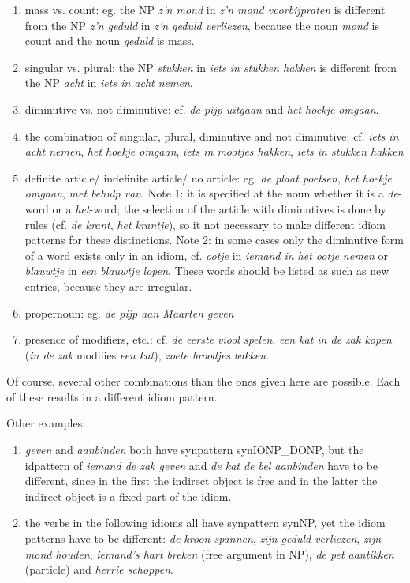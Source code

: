 \begin{enumerate}
  \item mass vs. count: eg. the NP {\em z'n mond} in {\em z'n mond
voorbijpraten} is different from the NP {\em z'n geduld} in {\em z'n geduld
verliezen}, because the noun {\em mond} is count and the noun {\em geduld} is
mass. 
  \item singular vs. plural: the NP {\em stukken} in {\em iets in stukken 
hakken} is different from the NP {\em acht} in  {\em iets in acht nemen}.
  \item diminutive vs. not diminutive: cf. {\em de pijp uitgaan} and {\em het 
hoekje omgaan}.
  \item the combination of singular, plural, diminutive and not diminutive: cf.
{\em iets in acht nemen}, {\em het hoekje omgaan}, {\em iets in mootjes
hakken}, {\em iets in stukken hakken} 
  \item definite article/ indefinite article/ no article: eg. {\em de plaat
poetsen}, {\em het hoekje omgaan}, {\em met behulp van}. Note 1: it is specified
at the noun whether it is a {\em de}-word or a {\em het}-word; the selection of
the article with diminutives is done by rules (cf. {\em de krant}, {\em het
krantje}), so it not necessary to make different idiom patterns for these
distinctions. Note 2: in some cases only the diminutive form of a word exists 
only in an idiom, cf. {\em ootje} in {\em iemand in het ootje nemen} or
{\em blauwtje} in {\em een blauwtje lopen}. These words should be listed as 
such as new entries, because they are irregular.
  \item propernoun: eg. {\em de pijp aan Maarten geven}
  \item presence of modifiers, etc.: cf. {\em de eerste viool spelen}, {\em een
kat in de zak kopen} ({\em in de zak} modifies {\em een kat}), {\em zoete
broodjes bakken}. 
\end{enumerate}

Of course, several other combinations than the ones given here are possible. 
Each of these results in a different idiom pattern.

Other examples:
\begin{enumerate}
  \item {\em geven} and {\em aanbinden} both have synpattern synIONP\_DONP, but
the idpattern of {\em iemand de zak geven} and {\em de kat de bel aanbinden}
have to be different, since in the first the indirect object is free and in the
latter the indirect object is a fixed part of the idiom. 
  \item the verbs in the following idioms all have synpattern synNP, yet the 
idiom patterns have to be different: {\em de kroon spannen}, {\em zijn geduld
verliezen}, {\em zijn mond houden}, {\em iemand's hart breken} (free argument 
in NP), {\em de pet aantikken} (particle) and {\em herrie schoppen}. 
\end{enumerate}

